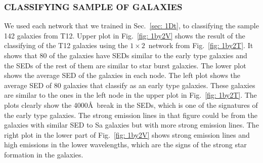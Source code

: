        \subsubsection{ CLASSIFYING SAMPLE OF GALAXIES}
         \label{sec: 1Dv}
            We used each network that we trained in Sec.~\ref{sec: 1Dt}, to classifying the sample 142 galaxies from T12.
            Upper plot in Fig.~\ref{fig: 1by2V} shows the result of the classifying of the T12 galaxies using the $1\times2$~network from Fig.~\ref{fig: 1by2T}.
            It shows that 80 of the galaxies have SEDs similar to the early type galaxies and the SEDs of the rest of them are similar to star burst galaxies.
            The lower plot shows the average SED of the galaxies in each node. 
            The left plot shows the average SED of 80 galaxies that classify as an early type galaxies. 
            These galaxies are similar to the ones in the left node in the upper plot in Fig.~\ref{fig: 1by2T}.
            The plots clearly show the 4000\AA~break in the SEDs, which is one of the signatures of the early type galaxies.
            The strong emission lines in that figure could be from the galaxies with similar SED to Sa galaxies but with more strong emission lines.
            The right plot in the lower part of Fig.~\ref{fig: 1by2V} shows strong emission lines and high emissions in the lower wavelengths, which are the signs of the strong star formation in the galaxies. 
